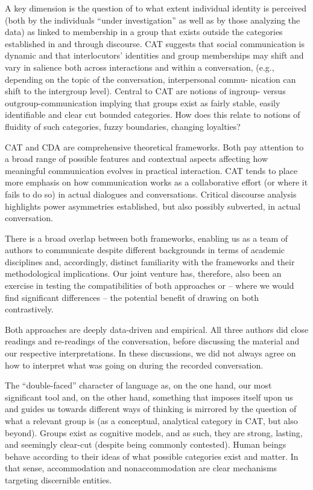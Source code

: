 \documentclass[output=paper,colorlinks,citecolor=brown]{langscibook}
\begin{document}
\begin{sloppypar}
A key dimension is the question of to what extent individual identity is perceived (both by the individuals ``under investigation'' as well as by those analyzing the data) as linked to membership in a group that exists outside the categories established in and through discourse. CAT suggests that social communication is dynamic and that interlocutors’ identities and group memberships may shift and vary in salience both across interactions and within a conversation, (e.g., depending on the topic of the conversation, interpersonal commu- nication can shift to the intergroup level). Central to CAT are notions of ingroup- versus outgroup-communication implying that groups exist as fairly stable, easily identifiable and clear cut bounded categories. How does this relate to notions of fluidity of such categories, fuzzy boundaries, changing loyalties? 
\end{sloppypar}

CAT and CDA are comprehensive theoretical frameworks. Both pay attention to a broad range of possible features and contextual aspects affecting how meaningful communication evolves in practical interaction. CAT tends to place more emphasis on how communication works as a collaborative effort (or where it fails to do so) in actual dialogues and conversations. Critical discourse analysis highlights power asymmetries established, but also possibly subverted, in actual conversation. 

There is a broad overlap between both frameworks, enabling us as a team of authors to communicate despite different backgrounds in terms of academic disciplines and, accordingly, distinct familiarity with the frameworks and their methodological implications. Our joint venture has, therefore, also been an exercise in testing the compatibilities of both approaches or -- where we would find significant differences -- the potential benefit of drawing on both contrastively. 

Both approaches are deeply data-driven and empirical. All three authors did close readings and re-readings of the conversation, before discussing the material and our respective interpretations. In these discussions, we did not always agree on how to interpret what was going on during the recorded conversation.

The ``double-faced'' character of language as, on the one hand, our most significant tool and, on the other hand, something that imposes itself upon us and guides us towards different ways of thinking is mirrored by the question of what a relevant group is (as a conceptual, analytical category in CAT, but also beyond). Groups exist as cognitive models, and as such, they are strong, lasting, and seemingly clear-cut (despite being commonly contested). Human beings behave according to their ideas of what possible categories exist and matter. In that sense, accommodation and nonaccommodation are clear mechanisms targeting discernible entities.
\end{document}
